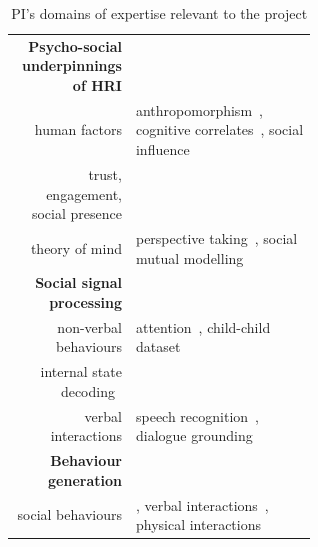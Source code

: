 \begin{table}[h]
    \centering
    \caption{\small PI's domains of expertise relevant to the \project project}
    \begin{tabular}{rp{0.6\linewidth}}
        \toprule
        \textbf{Psycho-social underpinnings of HRI} \\  
        human factors & \small anthropomorphism~\cite{lemaignan2014dynamics}, cognitive
        correlates~\cite{lemaignan2014cognitive}, social influence~\cite{winkle2019effective} \\
        trust, engagement, social presence & \small \cite{flook2019impact,lemaignan2015youre,fink2014which,irfan2018social} \\
        theory of mind & \small perspective taking~\cite{ros2010which, warnier2012when}, social mutual modelling~\cite{lemaignan2015mutual,dillenbourg2016symmetry} \\
        \midrule
        \textbf{Social signal processing}\\
        non-verbal behaviours & \small
        attention~\cite{lemaignan2016realtime,mohamed2022automatic},
        child-child dataset~\cite{lemaignan2018pinsoro}\\
        internal state decoding~\cite{bartlett2019what, webb2022measuring} \\
        verbal interactions & \small speech recognition~\cite{kennedy2017child}, dialogue grounding~\cite{lemaignan2011grounding} \\
        \midrule
        \textbf{Behaviour generation} \\
        social behaviours & \small \cite{lallee2011towards}, verbal interactions~\cite{wallbridge2019generating, wallbridge2019towards}, physical interactions~\cite{gharbi2013natural} \\


\end{tabular}
\end{table}
